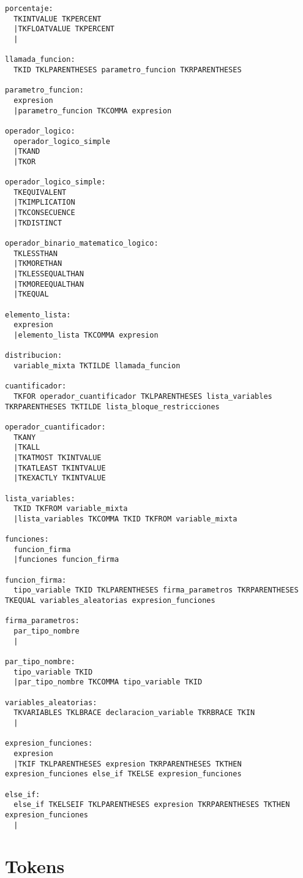 \begin{lstlisting}[mathescape]
porcentaje:
  TKINTVALUE TKPERCENT 
  |TKFLOATVALUE TKPERCENT 
  | 

llamada_funcion:
  TKID TKLPARENTHESES parametro_funcion TKRPARENTHESES 

parametro_funcion:
  expresion  
  |parametro_funcion TKCOMMA expresion 

operador_logico:
  operador_logico_simple  
  |TKAND                  
  |TKOR                   

operador_logico_simple:
  TKEQUIVALENT            
  |TKIMPLICATION          
  |TKCONSECUENCE          
  |TKDISTINCT             

operador_binario_matematico_logico:
  TKLESSTHAN              
  |TKMORETHAN             
  |TKLESSEQUALTHAN        
  |TKMOREEQUALTHAN        
  |TKEQUAL                

elemento_lista:
  expresion 
  |elemento_lista TKCOMMA expresion 

distribucion:
  variable_mixta TKTILDE llamada_funcion 

cuantificador:
  TKFOR operador_cuantificador TKLPARENTHESES lista_variables TKRPARENTHESES TKTILDE lista_bloque_restricciones

operador_cuantificador:
  TKANY                   
  |TKALL                  
  |TKATMOST TKINTVALUE    
  |TKATLEAST TKINTVALUE   
  |TKEXACTLY TKINTVALUE   

lista_variables:
  TKID TKFROM variable_mixta 
  |lista_variables TKCOMMA TKID TKFROM variable_mixta 

funciones:
  funcion_firma 
  |funciones funcion_firma

funcion_firma:
  tipo_variable TKID TKLPARENTHESES firma_parametros TKRPARENTHESES TKEQUAL variables_aleatorias expresion_funciones

firma_parametros:
  par_tipo_nombre 
  |

par_tipo_nombre:
  tipo_variable TKID 
  |par_tipo_nombre TKCOMMA tipo_variable TKID 

variables_aleatorias:
  TKVARIABLES TKLBRACE declaracion_variable TKRBRACE TKIN 
  | 

expresion_funciones:
  expresion 
  |TKIF TKLPARENTHESES expresion TKRPARENTHESES TKTHEN expresion_funciones else_if TKELSE expresion_funciones 

else_if:
  else_if TKELSEIF TKLPARENTHESES expresion TKRPARENTHESES TKTHEN expresion_funciones 
  | 
\end{lstlisting}

\section{Tokens}\label{tokens_lenguaje_detalle}

